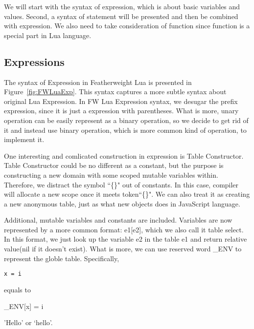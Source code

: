 \documentclass{article}
\begin{document}
We will start with the syntax of expression, which is about basic variables and values. Second, a syntax of statement will be presented and then be combined with expression. We also need to take consideration of function since function is a special part in Lua language.

\subsection{Expressions}
The syntax of Expression in Featherweight Lua is presented in Figure~\ref{fig:FWLuaExp}. This syntax captures a more subtle syntax about original Lua Expression. In FW Lua Expression syntax, we desugar the prefix expression, since it is just a expression with parentheses. What is more, unary operation can be easily represent as a binary operation, so we decide to get rid of it and instead use binary operation, which is more common kind of operation, to implement it.

One interesting and comlicated construction in expression is Table Constructor. Table Constructor could be no different as a constant, but the purpose is constructing a new domain with some scoped mutable variables within. Therefore, we distract the symbol ``\{\}" out of constants. In this case, compiler will allocate a new scope once it meets token``\{\}". We can also treat it as creating a new anonymous table, just as what new objects does in JavaScript language.  

Additional, mutable variables and constants are included. Variables are now represented by a more common format: e1[e2], which we also call it table select. In this format, we just look up the variable e2 in the table e1 and return relative value(nil if it doesn't exist). What is more, we can use reserved word \_ENV to represent the globle table. Specifically,
\begin{center}
\tt x = i\\ 
\end{center}
equals to
\begin{center}
\_ENV[x] = i\\
\end{center}


'Hello' or `hello'.
\end{document}
